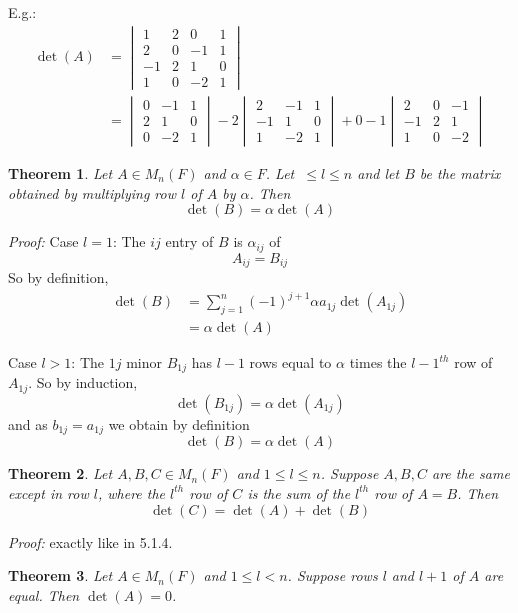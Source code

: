 \documentclass{report}
\newtheorem{theorem}{Theorem}[subsection]
\theoremstyle{remark}
\theoremstyle{definition}
\theoremstyle{definition}
\theoremstyle{theorem}
\begin{document}
E.g.:
\begin{align*}
    \det(A)&=\begin{vmatrix}
    1&2&0&1\\
    2&0&-1&1\\
    -1&2&1&0\\
    1&0&-2&1
    \end{vmatrix}\\
    &= \begin{vmatrix}
        0&-1&1\\
        2&1&0\\
        0&-2&1
    \end{vmatrix} -2 \begin{vmatrix}
        2&-1&1\\
        -1&1&0\\
        1&-2&1
    \end{vmatrix}+0-1\begin{vmatrix}
        2&0&-1\\
        -1&2&1\\
        1&0&-2
    \end{vmatrix}
\end{align*}
\begin{theorem}
Let $A \in M_n(F)$ and $ \alpha \in F$. Let $\ \leq l \leq n$ and  let $B$ be the matrix obtained by multiplying row $l$ of $A$ by $\alpha$. Then
\[\det(B)=\alpha \det(A)\]
\end{theorem}
\emph{Proof:} Case $l = 1$: The $ij$ entry of $B$ is $\alpha_{ij}$ of
\[A_{ij} = B_{ij}\] So by definition, 
\begin{align*}
    \det(B) &= \sum_{j=1}^n(-1)^{j+1}\alpha a_{1j}\det(A_{1j})\\
    &= \alpha\det(A)
\end{align*}\par
Case $l>1$: The $1j$ minor $B_{1j}$ has $l-1$ rows equal to $\alpha$ times the $l-1^{th}$ row of $A_{1j}$. So by induction,
\[\det(B_{1j}) = \alpha\det(A_{1j})\]
and as $b_{1j} = a_{1j}$ we obtain by definition
\[\det(B) = \alpha\det(A)\] \qedsymbol
\begin{theorem}
Let $A,B,C \in M_n(F)$ and $1 \leq l \leq n$. Suppose $A,B,C$ are the same except in row $l$, where the $l^{th}$ row of $C$ is the sum of the $l^{th}$ row of $A = B$. Then
\[\det(C) = \det(A) + \det(B)\]
\end{theorem}
\emph{Proof:} exactly like in 5.1.4.
\begin{theorem}
Let $A \in M_n(F)$ and $1 \leq l < n$. Suppose rows $l$ and $l+1$ of $A$ are equal. Then $\det(A)=0$.
\end{theorem}
\end{document}
